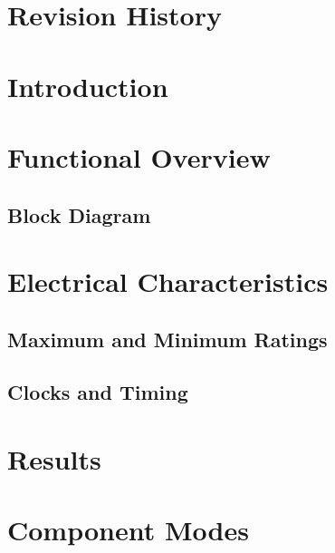 
\section{Revision History} \label{section:rev_history}

\section{Introduction} \label{section:introduction}

\section{Functional Overview}
\label{section:func_overview}
\subsection{Block Diagram}

\section{Electrical Characteristics}
\subsection{Maximum and Minimum Ratings}
\subsection{Clocks and Timing}




\section{Results}

\section{Component Modes}


 